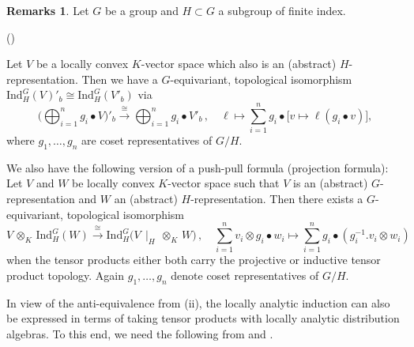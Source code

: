 \documentclass[a4paper, reqno, 10pt]{amsart}
\theoremstyle{definition}
\newtheorem{remarks}[theorem]{Remarks}
\newenvironment{altenumerate}
	{\begin{list}
		{\textup{(\theenumi)} }
		{\usecounter{enumi}
			\setlength{\labelwidth}{0pt}
			\setlength{\labelsep}{0pt}
			\setlength{\leftmargin}{0pt}
			\setlength{\itemsep}{0pt}
			\setlength{\topsep}{0pt}
		\renewcommand{\theenumi}{\roman{enumi}}
		}}
	{\end{list}}
\numberwithin{equation}{section}
\newcommand{\botimes}[1]{{\,\otimes_{#1}\,}}
\newcommand{\Ind}{{\mathrm{Ind}}}
\newcommand{\lra}{\longrightarrow}
\newcommand{\lto}{\longmapsto}
\newcommand{\mto}{\mapsto}
\newcommand{\res}[1]{{\!\,\mid_{#1}}}
\begin{document}
\begin{remarks}\label{Rmk 1 - Dual of finite induction}
	Let $G$ be a group and $H\subset G$ a subgroup of finite index.
	\begin{altenumerate}
		\item
		Let $V$ be a locally convex $K$-vector space which also is an (abstract) $H$-representation.
		Then we have a $G$-equivariant, topological isomorphism $\Ind_H^G(V)'_b \cong \Ind_H^G(V'_b)$ via
		\begin{equation*}
			\bigg( \bigoplus_{i=1}^n g_i \bullet V \bigg)'_b \overset{\cong}{\lra} \bigoplus_{i=1}^n g_i \bullet V'_b \,,\quad \ell \lto \sum_{i=1}^n g_i \bullet \big[ v \mto \ell(g_i \bullet v) \big]  ,
		\end{equation*}
		where $g_1,\ldots,g_n$ are coset representatives of $G/H$.
		\item
		We also have the following version of a push-pull formula (projection formula):
		Let $V$ and $W$ be locally convex $K$-vector space such that $V$ is an (abstract) $G$-representation and $W$ an (abstract) $H$-representation.
		Then there exists a $G$-equivariant, topological isomorphism
		\begin{equation*}
			V \botimes{K} \Ind^G_H (W) \overset{\cong}{\lra} \Ind^G_H \big( V\res{H} \botimes{K} W \big) \,,\quad \sum_{i=1}^n v_i \otimes  g_i \bullet w_i \lto \sum_{i=1}^n g_i \bullet (g_i^{-1}. v_i \otimes w_i)
		\end{equation*}
		when the tensor products either both carry the projective or inductive tensor product topology.
		Again $g_1,\ldots,g_n$ denote coset representatives of $G/H$.
	\end{altenumerate}
\end{remarks}


In view of the anti-equivalence from  (ii), the locally analytic induction can also be expressed in terms of taking tensor products with locally analytic distribution algebras.
To this end, we need the following from \cite[Rmk.\ 1.2.11]{Kohlhaase05InvDistpAdicAnGrp} and \cite[\S 1.2]{Emerton17LocAnVect}.
\end{document}
